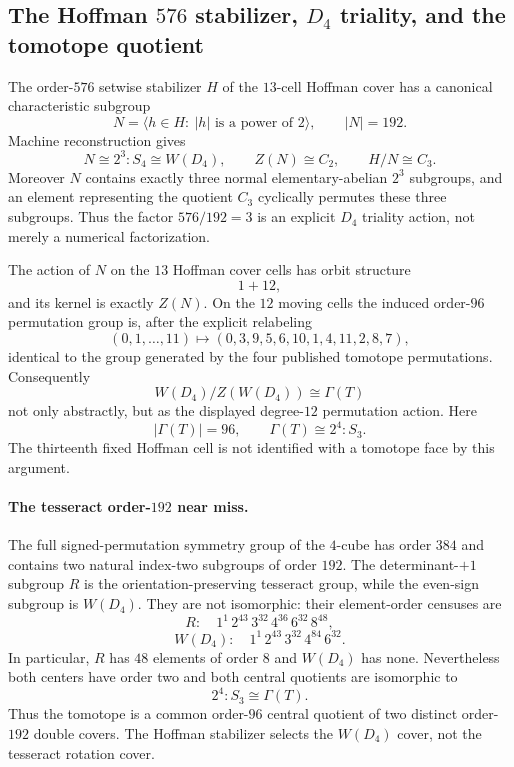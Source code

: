 \subsection{The Hoffman $576$ stabilizer, $D_4$ triality, and the tomotope quotient}
\label{sec:hoffman-d4-triality-tomotope}

The order-$576$ setwise stabilizer $H$ of the $13$-cell Hoffman cover has a
canonical characteristic subgroup
\[
 N=\langle h\in H:\ |h|\text{ is a power of }2\rangle,
 \qquad |N|=192.
\]
Machine reconstruction gives
\[
 N\cong 2^3\!:\!S_4\cong W(D_4),
 \qquad Z(N)\cong C_2,
 \qquad H/N\cong C_3.
\]
Moreover $N$ contains exactly three normal elementary-abelian $2^3$ subgroups,
and an element representing the quotient $C_3$ cyclically permutes these three
subgroups.  Thus the factor $576/192=3$ is an explicit $D_4$ triality action,
not merely a numerical factorization.

The action of $N$ on the $13$ Hoffman cover cells has orbit structure
\[
 1+12,
\]
and its kernel is exactly $Z(N)$.  On the $12$ moving cells the induced
order-$96$ permutation group is, after the explicit relabeling
\[
 (0,1,\ldots,11)\mapsto(0,3,9,5,6,10,1,4,11,2,8,7),
\]
identical to the group generated by the four published tomotope permutations.
Consequently
\[
 \boxed{W(D_4)/Z(W(D_4))\cong\Gamma(T)}
\]
not only abstractly, but as the displayed degree-$12$ permutation action.
Here
\[
 |\Gamma(T)|=96,
 \qquad \Gamma(T)\cong 2^4\!:\!S_3.
\]
The thirteenth fixed Hoffman cell is not identified with a tomotope face by this
argument.

\paragraph{The tesseract order-$192$ near miss.}
The full signed-permutation symmetry group of the $4$-cube has order $384$ and
contains two natural index-two subgroups of order $192$.  The determinant-$+1$
subgroup $R$ is the orientation-preserving tesseract group, while the even-sign
subgroup is $W(D_4)$.  They are not isomorphic: their element-order censuses are
\[
 R:\quad 1^1\,2^{43}\,3^{32}\,4^{36}\,6^{32}\,8^{48},
\]
\[
 W(D_4):\quad 1^1\,2^{43}\,3^{32}\,4^{84}\,6^{32}.
\]
In particular, $R$ has $48$ elements of order $8$ and $W(D_4)$ has none.
Nevertheless both centers have order two and both central quotients are
isomorphic to
\[
 2^4\!:\!S_3\cong\Gamma(T).
\]
Thus the tomotope is a common order-$96$ central quotient of two distinct
order-$192$ double covers.  The Hoffman stabilizer selects the $W(D_4)$ cover,
not the tesseract rotation cover.


